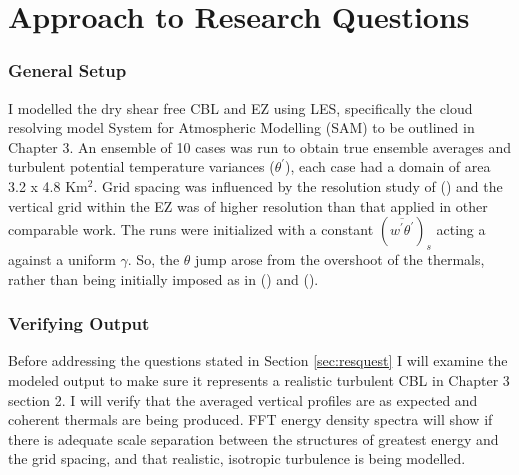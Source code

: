 \section{Approach to Research Questions}
\label{sec:Approach}
\subsubsection{General Setup}

I modelled the dry shear free \acs{CBL} and \acs{EZ} using \acs{LES}, specifically the cloud resolving model System for Atmospheric Modelling (SAM) to be outlined in Chapter 3.  An ensemble of 10 cases was run to obtain true ensemble averages and turbulent potential temperature variances ($\theta^{'}$), each case had a domain of area 3.2 x 4.8 Km$^{2}$. Grid spacing was influenced by the resolution study of \citeauthor{SullPat} (\citeyear{SullPat}) and the vertical grid within the \acs{EZ} was of higher resolution than that applied in other comparable work.  The runs were initialized with a constant $(\overline{w^{'}\theta^{'}})_{s}$ acting a against a uniform $\gamma$.  So, the  $\theta$ jump arose from the overshoot of the thermals, rather than being initially imposed as in \citeauthor{SullMoengStev} (\citeyear{SullMoengStev}) and \citeauthor{BrooksFowler2} (\citeyear{BrooksFowler2}).\\

\subsubsection{Verifying Output}

Before addressing the questions stated in Section \ref{sec:resquest} I will examine the modeled output to make sure it represents a realistic turbulent \acs{CBL} in Chapter 3 section 2. I will verify that the averaged vertical profiles are as expected and coherent thermals are being produced.  FFT energy density spectra will show if there is adequate scale separation between the structures of greatest energy and the grid spacing, and that realistic, isotropic turbulence is being modelled.  

